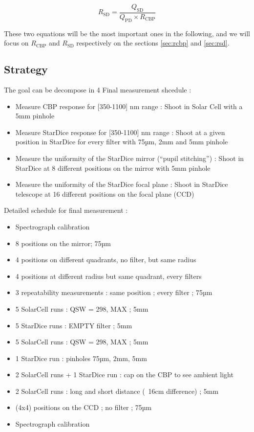 \documentclass[onecolumn]{aa}
\newcommand{\QSD}{Q_{\mathrm{SD}}}
\newcommand{\QPD}{Q_{\mathrm{PD}}}
\newcommand{\RCBP}{R_{\mathrm{CBP}}}
\newcommand{\RSD}{R_{\mathrm{SD}}}
\begin{document}
\begin{equation}
    \RSD = \frac{\QSD}{\QPD \times \RCBP}
    \label{eq:rsd}
\end{equation}


\noindent These two equations will be the most important ones in the following, and we will focus on $\RCBP$ and $\RSD$ respectively on the sections \ref{sec:rcbp} and \ref{sec:rsd}.

\subsection{Strategy}

The goal can be decompose in 4 
Final measurement shcedule :
\begin{itemize}
    \item Measure CBP response for [350-1100] nm range : Shoot in Solar Cell with a 5mm pinhole
    \item Measure StarDice response for [350-1100] nm range : Shoot at a given position in StarDice for every filter with 75µm, 2mm and 5mm pinhole
    \item Measure the uniformity of the StarDice mirror (“pupil stitching”) : Shoot in StarDice at 8 different positions on the mirror with 5mm pinhole
    \item Measure the uniformity of the StarDice focal plane : Shoot in StarDice telescope at 16 different positions on the focal plane (CCD)
\end{itemize}

Detailed schedule for final measurement :
\begin{itemize}
    \item Spectrograph calibration
    \item 8 positions on the mirror; 75µm
    \item 4 positions on different quadrants, no filter, but same radius 
    \item 4 positions at different radius but same quadrant, every filters
    \item 3 repeatability measurements : same position ; every filter ; 75µm
    \item 5 SolarCell runs : QSW = 298, MAX ; 5mm
    \item 5 StarDice runs : EMPTY filter ; 5mm
    \item 5 SolarCell runs : QSW = 298, MAX ; 5mm
    \item 1 StarDice run : pinholes 75µm, 2mm, 5mm
    \item 2 SolarCell runs + 1 StarDice run : cap on the CBP to see ambient light
    \item 2 SolarCell runs : long and short distance (~16cm difference) ; 5mm
    \item (4x4) positions on the CCD ; no filter ; 75µm
    \item Spectrograph calibration
\end{itemize}
\end{document}
